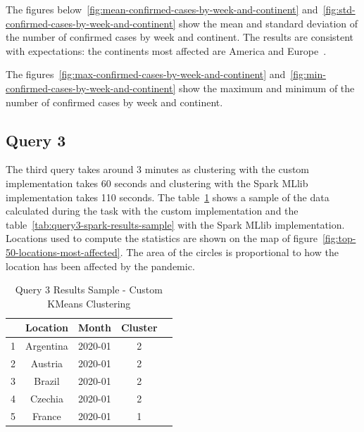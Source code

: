 \documentclass[12pt,oneside]{book} %
\begin{document}
\newpage

The figures below~\ref{fig:mean-confirmed-cases-by-week-and-continent}
and~\ref{fig:std-confirmed-cases-by-week-and-continent} show the mean and
standard deviation of the number of confirmed cases by week and continent. The
results are consistent with expectations: the continents most affected are
America and Europe~\cite{NYT}.


\newpage
The figures~\ref{fig:max-confirmed-cases-by-week-and-continent} and~\ref{fig:min-confirmed-cases-by-week-and-continent} show the maximum and minimum of the number of confirmed cases by week and continent.

\newpage
\subsection{Query 3}

The third query takes around 3 minutes as clustering with the custom
implementation takes 60 seconds and clustering with the Spark MLlib
implementation takes 110 seconds. The
table~\ref{tab:query3-custom-results-sample} shows a sample of the data
calculated during the task with the custom implementation and the
table~\ref{tab:query3-spark-results-sample} with the Spark MLlib
implementation. Locations used to compute the statistics are shown on the map
of figure~\ref{fig:top-50-locations-most-affected}. The area of the circles is
proportional to how the location has been affected by the pandemic.


\begin{table}[H]
    \centering
    \captionsetup{font=large}
    \caption{Query 3 Results Sample - Custom KMeans Clustering}
    \normalsize
    \begin{tabular}{|l|c|c|c|c|}
        \hline
          & Location  & Month   & Cluster \\
        \hline
        1 & Argentina & 2020-01 & 2       \\
        2 & Austria   & 2020-01 & 2       \\
        3 & Brazil    & 2020-01 & 2       \\
        4 & Czechia   & 2020-01 & 2       \\
        5 & France    & 2020-01 & 1       \\
        \hline
    \end{tabular}\label{tab:query3-custom-results-sample}
\end{table}
\end{document}
